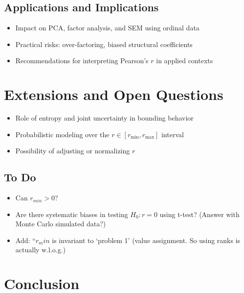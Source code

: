 \documentclass[
  12pt,
]{article}
\providecommand{\tightlist}{%
  \setlength{\itemsep}{0pt}\setlength{\parskip}{0pt}}\usepackage{longtable,booktabs,array}
\theoremstyle{plain}
\theoremstyle{definition}
\theoremstyle{remark}
\begin{document}
\subsection{Applications and
Implications}\label{applications-and-implications}

\begin{itemize}
\tightlist
\item
  Impact on PCA, factor analysis, and SEM using ordinal data\\
\item
  Practical risks: over-factoring, biased structural coefficients\\
\item
  Recommendations for interpreting Pearson's \(r\) in applied contexts
\end{itemize}

\section{Extensions and Open
Questions}\label{extensions-and-open-questions}

\begin{itemize}
\tightlist
\item
  Role of entropy and joint uncertainty in bounding behavior\\
\item
  Probabilistic modeling over the \(r \in [r_{\min}, r_{\max}]\)
  interval\\
\item
  Possibility of adjusting or normalizing \(r\)
\end{itemize}

\subsection{To Do}\label{to-do}

\begin{itemize}
\tightlist
\item
  Can \(r_{min} >0\)?
\item
  Are there systematic biases in testing \(H_0: r=0\) using t-test?
  (Answer with Monte Carlo simulated data?)
\item
  Add: ``\(r_min\) is invariant to `problem 1' (value assignment. So
  using ranks is actually w.l.o.g.)
\end{itemize}

\section{Conclusion}\label{conclusion}
\end{document}
